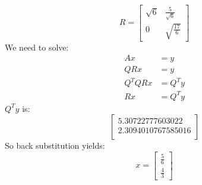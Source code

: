 \documentclass{article}
\begin{document}
\[
R = \begin{bmatrix}
\sqrt{6} & \frac{5}{\sqrt{6}} \\
0 & \sqrt{\frac{17}{6}}
\end{bmatrix}
\]
We need to solve: \\
\begin{align*}
Ax &= y \\
QRx &= y \\
Q^TQRx &= Q^Ty \\
Rx &= Q^Ty
\end{align*}
$Q^Ty$ is: \\
\[
\begin{bmatrix}
5.30722777603022\\
2.3094010767585016 \\
\end{bmatrix}
\]
So back substitution yields:\\
\[
x = \begin{bmatrix} \frac{5}{6} \\ \frac{4}{3} \end{bmatrix}
\]
\end{document}
